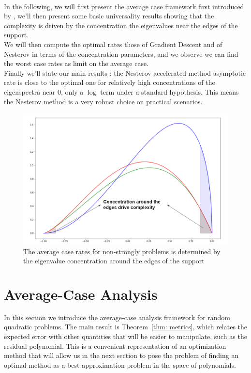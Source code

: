 \documentclass{article}
\begin{document}
\paragraph{}
In the following, we will first present the average case framework first introduced by \cite{pedregosa2020acceleration}, we'll then present some basic universality results showing that the complexity is driven by the concentration the eigenvalues near the edges of the support. \\
We will then compute the optimal rates those  of Gradient Descent and of Nesterov in terms of the concentration parameters, and we observe we can find the worst case rates as limit on the average case. \\
Finally we'll state our main results : the Nesterov accelerated method asymptotic rate is close to the optimal one for relatively high concentrations of the eigenspectra near $0$, only a $\log$ term under a standard hypothesis. This means the Nesterov method is a very robust choice on practical scenarios.


\begin{figure}[H]
    \centering
    \includegraphics[width=8 cm]{imgs/concentration.PNG}
    \caption{The average case rates for non-strongly problems is determined by the eigenvalue concentration around the edges of the support }
    \label{fig:my_label}
\end{figure}

\section{Average-Case Analysis} \label{sec:methods}


In this section we introduce the average-case analysis framework for random quadratic problems.
The main result is Theorem~\ref{thm: metrics}, which relates the expected error with other quantities that will be easier to manipulate, such as the residual polynomial. This is a convenient representation of an optimization method that will allow us in the next section to pose the problem of finding an optimal method as a best approximation problem in the space of polynomials.
\end{document}
